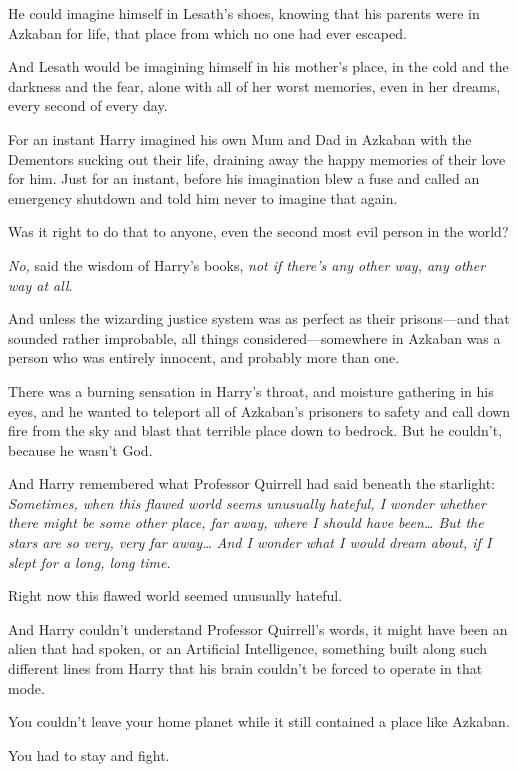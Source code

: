He could imagine himself in Lesath's shoes, knowing that his parents were in Azkaban for life, that place from which no one had ever escaped.

And Lesath would be imagining himself in his mother's place, in the cold and the darkness and the fear, alone with all of her worst memories, even in her dreams, every second of every day.

For an instant Harry imagined his own Mum and Dad in Azkaban with the Dementors sucking out their life, draining away the happy memories of their love for him. Just for an instant, before his imagination blew a fuse and called an emergency shutdown and told him never to imagine that again.

Was it right to do that to anyone, even the second most evil person in the world?

\emph{No,} said the wisdom of Harry's books, \emph{not if there's any other way, any other way at all}.

And unless the wizarding justice system was as perfect as their prisons---and that sounded rather improbable, all things considered---somewhere in Azkaban was a person who was entirely innocent, and probably more than one.

There was a burning sensation in Harry's throat, and moisture gathering in his eyes, and he wanted to teleport all of Azkaban's prisoners to safety and call down fire from the sky and blast that terrible place down to bedrock. But he couldn't, because he wasn't God.

And Harry remembered what Professor Quirrell had said beneath the starlight: \emph{Sometimes, when this flawed world seems unusually hateful, I wonder whether there might be some other place, far away, where I should have been{\ldots} But the stars are so very, very far away{\ldots} And I wonder what I would dream about, if I slept for a long, long time.}

Right now this flawed world seemed unusually hateful.

And Harry couldn't understand Professor Quirrell's words, it might have been an alien that had spoken, or an Artificial Intelligence, something built along such different lines from Harry that his brain couldn't be forced to operate in that mode.

You couldn't leave your home planet while it still contained a place like Azkaban.

You had to stay and fight.

